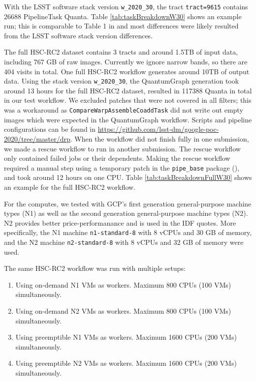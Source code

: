 With the LSST software stack version \texttt{w\_2020\_30}, the tract \texttt{tract=9615} contains 26688 PipelineTask Quanta.
Table \ref{tab:taskBreakdownW30} shows an example run; this is comparable to Table 1 in  and most differences were likely resulted from the LSST software stack version differences.


The full HSC-RC2 dataset contains 3 tracts and around 1.5TB of input data, including 767 GB of raw images.
Currently we ignore narrow bands, so there are 404 visits in total.
One full HSC-RC2 workflow generates around 10TB of output data.
Using the stack version \texttt{w\_2020\_30}, the QuantumGraph generation took around 13 hours for the full HSC-RC2 dataset, resulted in 117388 Quanta in total in our test workflow.
We excluded patches that were not covered in all filters; this was a workaround as \texttt{CompareWarpAssembleCoaddTask} did not write out empty images which were expected in the QuantumGraph workflow.
Scripts and pipeline configurations can be found in \url{https://github.com/lsst-dm/google-poc-2020/tree/master/drp}.
When the workflow did not finish fully in one submission, we made a rescue workflow to run in another submission.
The rescue workflow only contained failed jobs or their dependents.
Making the rescue workflow required a manual step using a temporary patch in the \texttt{pipe\_base} package (), and took around 12 hours on one CPU.
Table \ref{tab:taskBreakdownFullW30} shows an example for the full HSC-RC2 workflow.



For the computes, we tested with GCP's first generation general-purpose machine types (N1) as well as the second generation general-purpose machine types (N2).
N2 provides better price-performanance and is used in the IDF quotes.
More specifically, the N1 machine \texttt{n1-standard-8} with 8 vCPUs and 30 GB of memory, and the N2 machine \texttt{n2-standard-8} with 8 vCPUs and 32 GB of memory were used.

The same HSC-RC2 workflow was run with multiple setups:

\begin{enumerate}
\item
Using on-demand N1 VMs as workers. Maximum 800 CPUs (100 VMs) simultaneously.
\item
Using on-demand N2 VMs as workers. Maximum 800 CPUs (100 VMs) simultaneously.
\item
Using preemptible N1 VMs as workers. Maximum 1600 CPUs (200 VMs) simultaneously.
\item
Using preemptible N2 VMs as workers. Maximum 1600 CPUs (200 VMs) simultaneously.
\end{enumerate}

